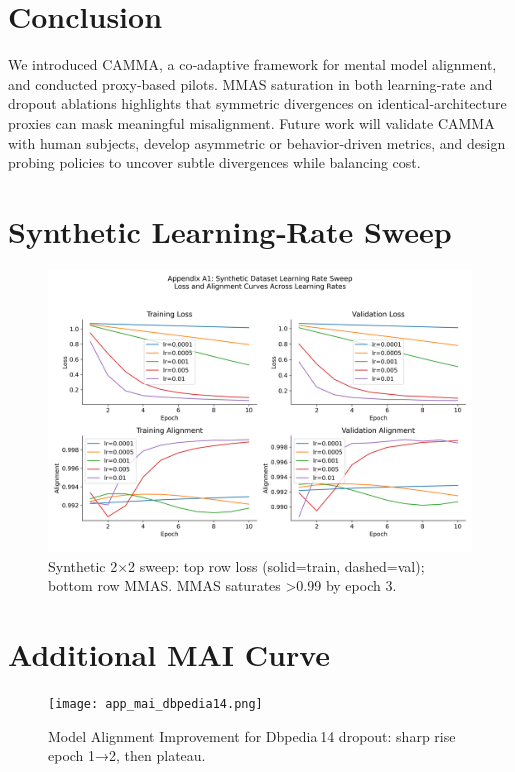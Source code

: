 \documentclass{article}
\begin{document}
\section{Conclusion}
We introduced CAMMA, a co‐adaptive framework for mental model alignment, and conducted proxy‐based pilots. MMAS saturation in both learning‐rate and dropout ablations highlights that symmetric divergences on identical‐architecture proxies can mask meaningful misalignment. Future work will validate CAMMA with human subjects, develop asymmetric or behavior‐driven metrics, and design probing policies to uncover subtle divergences while balancing cost.




\appendix
\section{Synthetic Learning‐Rate Sweep}
\label{app:synthetic}
\begin{figure}[h]
  \centering
  \includegraphics[width=0.85\linewidth]{app_synth_lr_sweep.png}
  \caption{Synthetic 2×2 sweep: top row loss (solid=train, dashed=val); bottom row MMAS. MMAS saturates >0.99 by epoch 3.}
  \label{fig:synthetic}
\end{figure}

\section{Additional MAI Curve}
\label{app:maisecond}
\begin{figure}[h]
  \centering
  \texttt{[image: app\_mai\_dbpedia14.png]}
  \caption{Model Alignment Improvement for Dbpedia 14 dropout: sharp rise epoch 1→2, then plateau.}
\end{figure}
\end{document}
